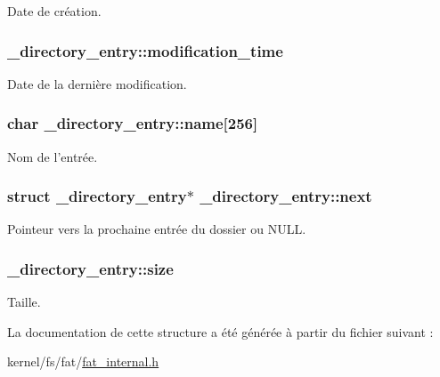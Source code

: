 Date de création. \hypertarget{struct__directory__entry_a120c3a3857bd7892a0fc2e6644e6f188}{
\subsubsection[{modification\-\_\-time}]{ \-\_\-directory\-\_\-entry\-::modification\-\_\-time}}\label{struct__directory__entry_a120c3a3857bd7892a0fc2e6644e6f188}
Date de la dernière modification. \hypertarget{struct__directory__entry_ac9142fdeb8e265f045fee1edf9608c78}{
\subsubsection[{name}]{\setlength{\rightskip}{0pt plus 5cm}char \-\_\-directory\-\_\-entry\-::name\mbox{[}256\mbox{]}}}\label{struct__directory__entry_ac9142fdeb8e265f045fee1edf9608c78}
Nom de l'entrée. \hypertarget{struct__directory__entry_a75001bda0d1d80e4ff5350ad69f83030}{
\subsubsection[{next}]{\setlength{\rightskip}{0pt plus 5cm}struct {\bf \-\_\-directory\-\_\-entry}$\ast$ \-\_\-directory\-\_\-entry\-::next}}\label{struct__directory__entry_a75001bda0d1d80e4ff5350ad69f83030}
Pointeur vers la prochaine entrée du dossier ou N\-U\-L\-L. \hypertarget{struct__directory__entry_a5d6f559c1b7ab2b5a64643073172cc25}{
\subsubsection[{size}]{ \-\_\-directory\-\_\-entry\-::size}}\label{struct__directory__entry_a5d6f559c1b7ab2b5a64643073172cc25}
Taille. 

La documentation de cette structure a été générée à partir du fichier suivant \-:\begin{DoxyCompactItemize}
\item 
kernel/fs/fat/\hyperlink{fat__internal_8h}{fat\-\_\-internal.\-h}\end{DoxyCompactItemize}
